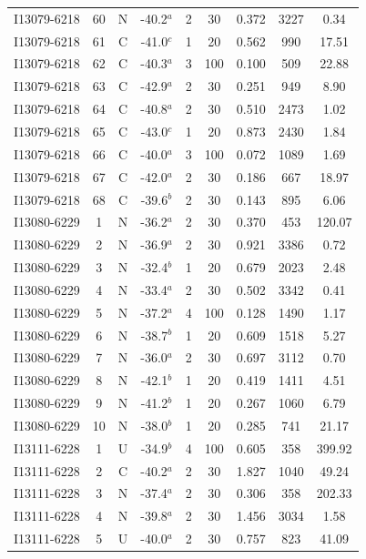 \begin{table}
\begin{tabular}{ccccccccc}
I13079-6218 & 60 & N & -40.2$^{a}$ & 2 & 30 & 0.372 & 3227 & 0.34 \\
I13079-6218 & 61 & C & -41.0$^{c}$ & 1 & 20 & 0.562 & 990 & 17.51 \\
I13079-6218 & 62 & C & -40.3$^{a}$ & 3 & 100 & 0.100 & 509 & 22.88 \\
I13079-6218 & 63 & C & -42.9$^{a}$ & 2 & 30 & 0.251 & 949 & 8.90 \\
I13079-6218 & 64 & C & -40.8$^{a}$ & 2 & 30 & 0.510 & 2473 & 1.02 \\
I13079-6218 & 65 & C & -43.0$^{c}$ & 1 & 20 & 0.873 & 2430 & 1.84 \\
I13079-6218 & 66 & C & -40.0$^{a}$ & 3 & 100 & 0.072 & 1089 & 1.69 \\
I13079-6218 & 67 & C & -42.0$^{a}$ & 2 & 30 & 0.186 & 667 & 18.97 \\
I13079-6218 & 68 & C & -39.6$^{b}$ & 2 & 30 & 0.143 & 895 & 6.06 \\
I13080-6229 & 1 & N & -36.2$^{a}$ & 2 & 30 & 0.370 & 453 & 120.07 \\
I13080-6229 & 2 & N & -36.9$^{a}$ & 2 & 30 & 0.921 & 3386 & 0.72 \\
I13080-6229 & 3 & N & -32.4$^{b}$ & 1 & 20 & 0.679 & 2023 & 2.48 \\
I13080-6229 & 4 & N & -33.4$^{a}$ & 2 & 30 & 0.502 & 3342 & 0.41 \\
I13080-6229 & 5 & N & -37.2$^{a}$ & 4 & 100 & 0.128 & 1490 & 1.17 \\
I13080-6229 & 6 & N & -38.7$^{b}$ & 1 & 20 & 0.609 & 1518 & 5.27 \\
I13080-6229 & 7 & N & -36.0$^{a}$ & 2 & 30 & 0.697 & 3112 & 0.70 \\
I13080-6229 & 8 & N & -42.1$^{b}$ & 1 & 20 & 0.419 & 1411 & 4.51 \\
I13080-6229 & 9 & N & -41.2$^{b}$ & 1 & 20 & 0.267 & 1060 & 6.79 \\
I13080-6229 & 10 & N & -38.0$^{b}$ & 1 & 20 & 0.285 & 741 & 21.17 \\
I13111-6228 & 1 & U & -34.9$^{b}$ & 4 & 100 & 0.605 & 358 & 399.92 \\
I13111-6228 & 2 & C & -40.2$^{a}$ & 2 & 30 & 1.827 & 1040 & 49.24 \\
I13111-6228 & 3 & N & -37.4$^{a}$ & 2 & 30 & 0.306 & 358 & 202.33 \\
I13111-6228 & 4 & N & -39.8$^{a}$ & 2 & 30 & 1.456 & 3034 & 1.58 \\
I13111-6228 & 5 & U & -40.0$^{a}$ & 2 & 30 & 0.757 & 823 & 41.09 \\

\end{tabular}
\end{table}
